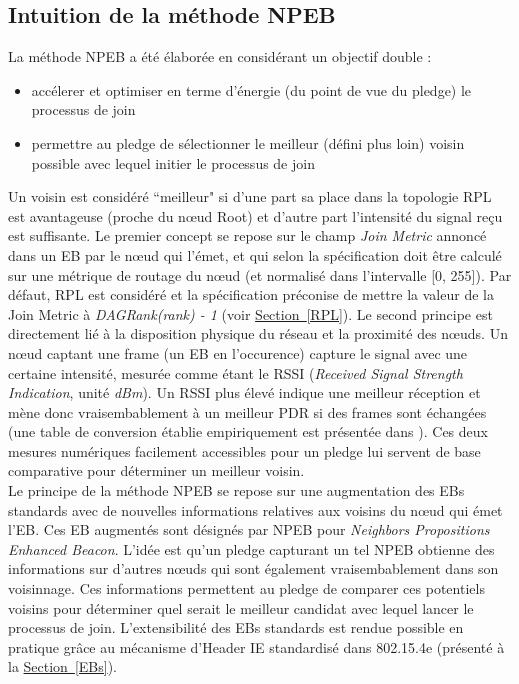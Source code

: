 \documentclass[]{report}
\newcommand{\wordlink}[2]{\hyperref[#2]{#1~\ref{#2}}}
\begin{document}
\subsection{Intuition de la méthode NPEB}

La méthode NPEB a été élaborée en considérant un objectif double :
\begin{itemize}[label=$\bullet$]
\item accélerer et optimiser en terme d'énergie (du point de vue du pledge) le processus de join
\item permettre au pledge de sélectionner le meilleur (défini plus loin) voisin possible avec lequel initier le processus de join
\end{itemize}

Un voisin est considéré ``meilleur" si d'une part sa place dans la topologie RPL est avantageuse (proche du nœud Root) et d'autre part l'intensité du signal reçu est suffisante.  Le premier concept se repose sur le champ \textit{Join Metric} annoncé dans un EB par le nœud qui l'émet, et qui selon la spécification \cite{rfc8180} doit être calculé sur une métrique de routage du nœud (et normalisé dans l'intervalle [0, 255]). Par défaut, RPL est considéré et la spécification préconise de mettre la valeur de la Join Metric à \textit{DAGRank(rank) - 1} (voir \wordlink{Section}{RPL}). Le second principe est directement lié à la disposition physique du réseau et la proximité des nœuds. Un nœud captant une frame (un EB en l'occurence) capture le signal avec une certaine intensité, mesurée comme étant le RSSI (\textit{Received Signal Strength Indication}, unité \textit{dBm}). Un RSSI plus élevé indique une meilleur réception et mène donc vraisembablement à un meilleur PDR si des frames sont échangées (une table de conversion établie empiriquement est présentée dans \cite{simulating-6TiSCH}). Ces deux mesures numériques facilement accessibles pour un pledge lui servent de base comparative pour déterminer un meilleur voisin.\\

Le principe de la méthode NPEB se repose sur une augmentation des EBs standards avec de nouvelles informations relatives aux voisins du nœud qui émet l'EB. Ces EB augmentés sont désignés par NPEB pour \textit{Neighbors Propositions Enhanced Beacon}. L'idée est qu'un pledge capturant un tel NPEB obtienne des informations sur d'autres nœuds qui sont également vraisembablement dans son voisinnage. Ces informations permettent au pledge de comparer ces potentiels voisins pour déterminer quel serait le meilleur candidat avec lequel lancer le processus de join. L'extensibilité des EBs standards est rendue possible en pratique grâce au mécanisme d'Header IE standardisé dans 802.15.4e (présenté à la \wordlink{Section}{EBs}).\\
\end{document}
